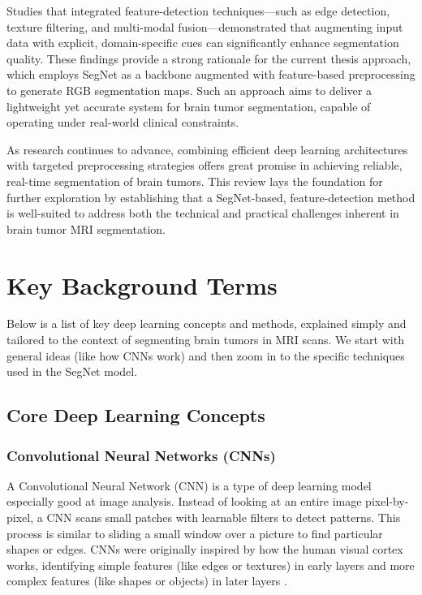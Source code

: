 Studies that integrated feature-detection techniques—such as edge detection, texture filtering, and multi-modal fusion—demonstrated that augmenting input data with explicit, domain-specific cues can significantly enhance segmentation quality. These findings provide a strong rationale for the current thesis approach, which employs SegNet as a backbone augmented with feature-based preprocessing to generate RGB segmentation maps. Such an approach aims to deliver a lightweight yet accurate system for brain tumor segmentation, capable of operating under real-world clinical constraints.

As research continues to advance, combining efficient deep learning architectures with targeted preprocessing strategies offers great promise in achieving reliable, real-time segmentation of brain tumors. This review lays the foundation for further exploration by establishing that a SegNet-based, feature-detection method is well-suited to address both the technical and practical challenges inherent in brain tumor MRI segmentation.

\section{Key Background Terms}
\label{sec:key_terms}

Below is a list of key deep learning concepts and methods, explained simply and tailored to the context of segmenting brain tumors in MRI scans. We start with general ideas (like how CNNs work) and then zoom in to the specific techniques used in the SegNet model.

\subsection{Core Deep Learning Concepts}
\label{sec:core_dl_concepts}

\subsubsection{Convolutional Neural Networks (CNNs)}
\label{sec:cnn_definition}

A Convolutional Neural Network (CNN) is a type of deep learning model especially good at image analysis. Instead of looking at an entire image pixel-by-pixel, a CNN scans small patches with learnable filters to detect patterns. This process is similar to sliding a small window over a picture to find particular shapes or edges. CNNs were originally inspired by how the human visual cortex works, identifying simple features (like edges or textures) in early layers and more complex features (like shapes or objects) in later layers \cite{datacamp2023cnn}. 

